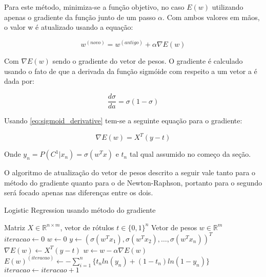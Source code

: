 Para este método, minimiza-se a função objetivo, no caso $E(w)$ utilizando apenas o gradiente
da função junto de um passo $\alpha$. Com ambos valores em mãos, o valor w é atualizado usando
a equação:

\begin{center}
	\begin{equation}
		w^{ ( novo )} = w^{ (antigo) }  + \alpha \nabla E(w)
	\end{equation}
\end{center}

Com $\nabla E(w)$ sendo o gradiente do vetor de pesos. O gradiente é calculado usando o fato de que
a derivada da função sigmóide com respeito a um vetor a é dada por:

\begin{center}
	\begin{equation}
	\label{eq:sigmoid_derivative}
		\frac{d \sigma}{d a} = \sigma (1 - \sigma )
	\end{equation}
\end{center}

Usando \ref{eq:sigmoid_derivative} tem-se a seguinte equação para o gradiente:

\begin{center}
	\begin{equation}\label{eq:gradient}
		\nabla E(w) = X^T(y - t)
	\end{equation}
\end{center}

Onde $y_n = P(C^1 | x_n) = \sigma(w^Tx)$ e $t_n$ tal qual assumido no começo da seção.

O algoritmo de atualização do vetor de pesos descrito a seguir vale tanto para o método
do gradiente quanto para o de Newton-Raphson, portanto para o segundo será focado apenas nas
diferenças entre os dois.


\begin{algorithm}[H]
	\caption{Logistic Regression usando método do gradiente}
	\begin{algorithmic}[1]
		\REQUIRE Matriz $ X \in \mathbb{R}^{n \times m} $, 
		vetor de rótulos $t \in \{0, 1\}^n$
		\ENSURE Vetor de pesos $w \in \mathbb{R}^m$
		\STATE $iteracao \leftarrow 0$
		\STATE $w \leftarrow 0$
		 \label{lst:line:condition}
			\STATE $y \leftarrow (\sigma(w^Tx_1), \sigma(w^Tx_2), \ldots, \sigma(w^Tx_n))^T$
			\STATE $\nabla E(w) \leftarrow X^T(y - t)$
			\STATE $w \leftarrow w - \alpha \nabla E(w)$
			\STATE $E(w)^{ (iteracao) } \leftarrow 
			- \sum_{i = 1}^{n} \{ t_nln(y_n) + (1 - t_n) ln(1 - y_n) \}$
			\STATE $iteracao \leftarrow iteracao + 1$
		\ENDWHILE
	\end{algorithmic}
\end{algorithm}

